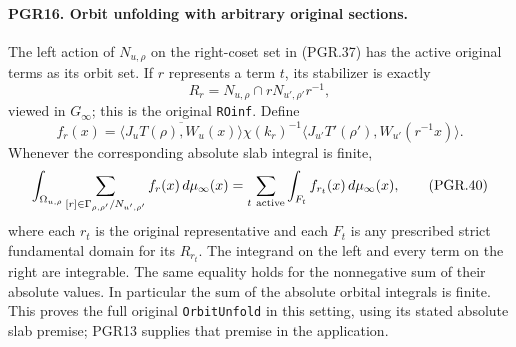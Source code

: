 \paragraph{PGR16. Orbit unfolding with arbitrary original sections.}
\label{claim:PGR16}
The left action of \(N_{u,\rho}\) on the right-coset set in
(PGR.37) has the active original terms as its orbit set.  If \(r\)
represents a term \(t\), its stabilizer is exactly
\[
 R_r=N_{u,\rho}\cap rN_{u',\rho'}r^{-1},
\tag{PGR.38}
\]
viewed in \(G_\infty\); this is the original
\texttt{ROinf}.  Define
\[
 f_r(x)=\overline{\langle J_uT(\rho),W_u(x)\rangle}
       \chi(k_r)^{-1}
       \langle J_{u'}T'(\rho'),W_{u'}(r^{-1}x)\rangle.
\tag{PGR.39}
\]
Whenever the corresponding absolute slab integral is finite,
\[
 \int_{\Omega_{u,\rho}}
       \sum_{[r]\in\Gamma_{\rho,\rho'}/N_{u',\rho'}}
                 f_r(x)\,d\mu_\infty(x)
   =\sum_{t\ {\rm active}}\int_{F_t} f_{r_t}(x)\,d\mu_\infty(x),
\tag{PGR.40}
\]
where each \(r_t\) is the original representative and each
\(F_t\) is any prescribed strict fundamental domain for its
\(R_{r_t}\).  The integrand on the left and every term on the
right are integrable.  The same equality holds for the nonnegative
sum of their absolute values.  In particular the sum of the absolute
orbital integrals is finite.  This proves the full original
\texttt{OrbitUnfold} in this setting, using its stated absolute
slab premise; PGR13 supplies that premise in the application.
